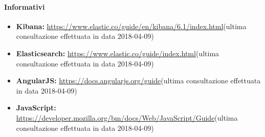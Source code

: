 		\paragraph{Informativi} 
			\begin{itemize}
				\item \textbf{Kibana:} \href{https://www.elastic.co/guide/en/kibana/6.1/index.html}{https://www.elastic.co/guide/en/kibana/6.1/index.html}(ultima consultazione effettuata in data 2018-04-09)
				\item \textbf{Elasticsearch:} \href{https://www.elastic.co/guide/index.html}{https://www.elastic.co/guide/index.html}(ultima consultazione effettuata in data 2018-04-09)
				\item \textbf{AngularJS:} \href{https://docs.angularjs.org/guide}{https://docs.angularjs.org/guide}(ultima consultazione effettuata in data 2018-04-09)
				\item \textbf{JavaScript:} \href{https://developer.mozilla.org/bm/docs/Web/JavaScript/Guide}{https://developer.mozilla.org/bm/docs/Web/JavaScript/Guide}(ultima consultazione effettuata in data 2018-04-09)
			\end{itemize}